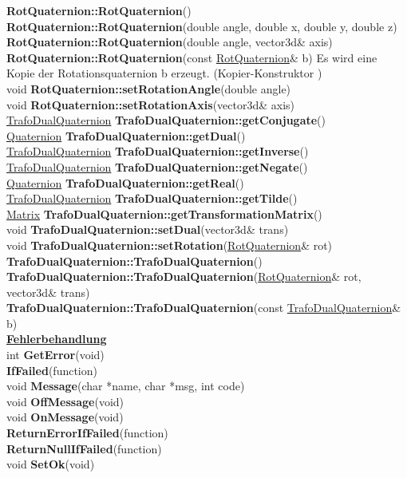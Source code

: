 \documentclass[10pt,titlepage]{article}
\newcommand{\subtitle}[1]{{\noindent\bf#1}}
\def\functionlistentry#1#2#3#4#5#6{\noindent #1 {\bf #2}(#3) \dotfill #6\\}
\begin{document}
{{\functionlistentry{}{RotQuaternion::RotQuaternion}{}{1478}{quaternions}{}
\functionlistentry{}{RotQuaternion::RotQuaternion}{double angle, double x, double y, double z}{1479}{quaternions}{}
\functionlistentry{}{RotQuaternion::RotQuaternion}{double angle, vector3d\& axis}{1480}{quaternions}{}
\functionlistentry{}{RotQuaternion::RotQuaternion}{const \hyperlink{RotQuaternion}{RotQuaternion}\& b) { Es wird eine Kopie der Rotationsquaternion b erzeugt. (Kopier-Konstruktor} }{1481}{quaternions}{}
\functionlistentry{void}{RotQuaternion::setRotationAngle}{double angle}{1489}{quaternions}{}
\functionlistentry{void}{RotQuaternion::setRotationAxis}{vector3d\& axis}{1490}{quaternions}{}
\functionlistentry{\hyperlink{TrafoDualQuaternion}{TrafoDualQuaternion}}{TrafoDualQuaternion::getConjugate}{}{1534}{quaternions}{}
\functionlistentry{\hyperlink{Quaternion}{Quaternion}}{TrafoDualQuaternion::getDual}{}{1530}{quaternions}{}
\functionlistentry{\hyperlink{TrafoDualQuaternion}{TrafoDualQuaternion}}{TrafoDualQuaternion::getInverse}{}{1536}{quaternions}{}
\functionlistentry{\hyperlink{TrafoDualQuaternion}{TrafoDualQuaternion}}{TrafoDualQuaternion::getNegate}{}{1533}{quaternions}{}
\functionlistentry{\hyperlink{Quaternion}{Quaternion}}{TrafoDualQuaternion::getReal}{}{1529}{quaternions}{}
\functionlistentry{\hyperlink{TrafoDualQuaternion}{TrafoDualQuaternion}}{TrafoDualQuaternion::getTilde}{}{1535}{quaternions}{}
\functionlistentry{\hyperlink{Matrix}{Matrix}}{TrafoDualQuaternion::getTransformationMatrix}{}{1537}{quaternions}{}
\functionlistentry{void}{TrafoDualQuaternion::setDual}{vector3d\& trans}{1532}{quaternions}{}
\functionlistentry{void}{TrafoDualQuaternion::setRotation}{\hyperlink{RotQuaternion}{RotQuaternion}\& rot}{1531}{quaternions}{}
\functionlistentry{}{TrafoDualQuaternion::TrafoDualQuaternion}{}{1526}{quaternions}{}
\functionlistentry{}{TrafoDualQuaternion::TrafoDualQuaternion}{\hyperlink{RotQuaternion}{RotQuaternion}\& rot, vector3d\& trans}{1527}{quaternions}{}
\functionlistentry{}{TrafoDualQuaternion::TrafoDualQuaternion}{const \hyperlink{TrafoDualQuaternion}{TrafoDualQuaternion}\& b}{1528}{quaternions}{}

\subtitle{\hyperlink{SECTION:errorHandling}{Fehlerbehandlung}}\\
\functionlistentry{int}{GetError}{void}{1550}{errorHandling}{}
\functionlistentry{}{IfFailed}{function}{1553}{errorHandling}{}
\functionlistentry{void}{Message}{char *name, char *msg, int code}{1546}{errorHandling}{}
\functionlistentry{void}{OffMessage}{void}{1547}{errorHandling}{}
\functionlistentry{void}{OnMessage}{void}{1548}{errorHandling}{}
\functionlistentry{}{ReturnErrorIfFailed}{function}{1552}{errorHandling}{}
\functionlistentry{}{ReturnNullIfFailed}{function}{1551}{errorHandling}{}
\functionlistentry{void}{SetOk}{void}{1549}{errorHandling}{}

}}
\end{document}
